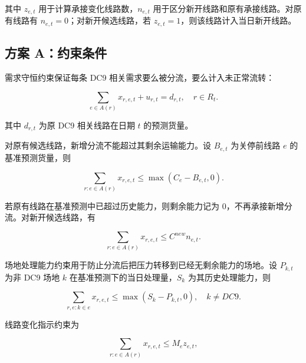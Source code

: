 \documentclass[UTF8,zihao=-4,a4paper,fontset=fandol]{ctexart}
\begin{document}
其中 $z_{e,t}$ 用于计算承接变化线路数，$n_{e,t}$ 用于区分新开线路和原有承接线路。对原有线路有 $n_{e,t}=0$；对新开候选线路，若 $z_{e,t}=1$，则该线路计入当日新开线路。



\subsection{方案 A：约束条件}



需求守恒约束保证每条 DC9 相关需求要么被分流，要么计入未正常流转：



\begin{equation}
\sum_{e\in A(r)}x_{r,e,t}+u_{r,t}=d_{r,t},\quad r\in R_t.
\end{equation}



其中 $d_{r,t}$ 为原 DC9 相关线路在日期 $t$ 的预测货量。



对原有候选线路，新增分流不能超过其剩余运输能力。设 $B_{e,t}$ 为关停前线路 $e$ 的基准预测货量，则



\begin{equation}
\sum_{r:e\in A(r)}x_{r,e,t}\le \max(C_e-B_{e,t},0).
\end{equation}



若原有线路在基准预测中已超过历史能力，则剩余能力记为 0，不再承接新增分流。对新开候选线路，有



\begin{equation}
\sum_{r:e\in A(r)}x_{r,e,t}\le C^{new} n_{e,t}.
\end{equation}



场地处理能力约束用于防止分流后把压力转移到已经无剩余能力的场地。设 $P_{k,t}$ 为非 DC9 场地 $k$ 在基准预测下的当日处理量，$S_k$ 为其历史处理能力，则



\begin{equation}
\sum_{r,e:k\in e}x_{r,e,t}\le \max(S_k-P_{k,t},0),\quad k\ne DC9.
\end{equation}



线路变化指示约束为



\begin{equation}
\sum_{r:e\in A(r)}x_{r,e,t}\le M_e z_{e,t},
\end{equation}
\end{document}
